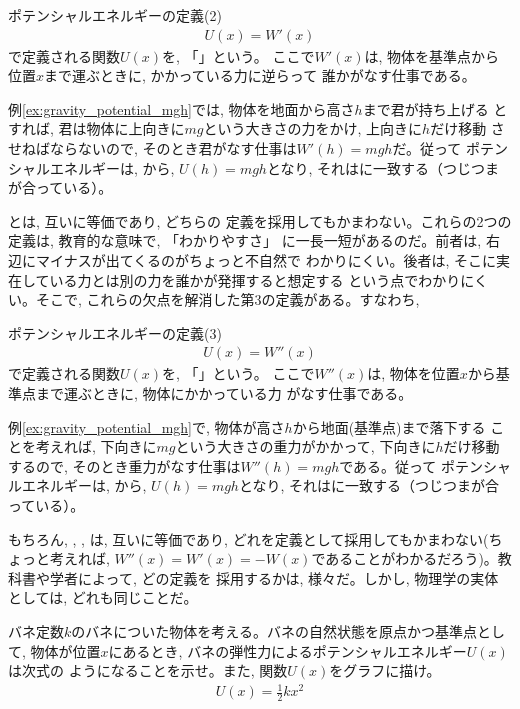 \begin{itembox}{ポテンシャルエネルギーの定義(2)}
\begin{eqnarray}
U(x)=W'(x)\label{eq:potential2}
\end{eqnarray}
で定義される関数$U(x)$を, 「」という。
ここで$W'(x)$は, 物体を基準点から位置$x$まで運ぶときに, かかっている力に逆らって
誰かがなす仕事である。
\end{itembox}

例\ref{ex:gravity_potential_mgh}では, 物体を地面から高さ$h$まで君が持ち上げる
とすれば, 君は物体に上向きに$mg$という大きさの力をかけ, 上向きに$h$だけ移動
させねばならないので, そのとき君がなす仕事は$W'(h)=mgh$だ。従って
ポテンシャルエネルギーは, から, $U(h)=mgh$となり, 
それはに一致する（つじつまが合っている）。

とは, 互いに等価であり, どちらの
定義を採用してもかまわない。これらの2つの定義は, 教育的な意味で, 「わかりやすさ」
に一長一短があるのだ。前者は, 右辺にマイナスが出てくるのがちょっと不自然で
わかりにくい。後者は, そこに実在している力とは別の力を誰かが発揮すると想定する
という点でわかりにくい。そこで, これらの欠点を解消した第3の定義がある。すなわち, 

\begin{itembox}{ポテンシャルエネルギーの定義(3)}
\begin{eqnarray}
U(x)=W''(x)\label{eq:potential3}
\end{eqnarray}
で定義される関数$U(x)$を, 「」という。
ここで$W''(x)$は, 物体を位置$x$から基準点まで運ぶときに, 物体にかかっている力
がなす仕事である。
\end{itembox}

例\ref{ex:gravity_potential_mgh}で, 物体が高さ$h$から地面(基準点)まで落下する
ことを考えれば, 下向きに$mg$という大きさの重力がかかって, 下向きに$h$だけ移動
するので, そのとき重力がなす仕事は$W''(h)=mgh$である。従って
ポテンシャルエネルギーは, から, $U(h)=mgh$となり, 
それはに一致する（つじつまが合っている）。

もちろん, , , 
は, 互いに等価であり, どれを定義として採用してもかまわない(ちょっと考えれば, 
$W''(x)=W'(x)=-W(x)$であることがわかるだろう)。教科書や学者によって, どの定義を
採用するかは, 様々だ。しかし, 物理学の実体としては, どれも同じことだ。\mv

\begin{q}\label{q:potential_spring}
バネ定数$k$のバネについた物体を考える。バネの自然状態を原点かつ基準点として, 
物体が位置$x$にあるとき, バネの弾性力によるポテンシャルエネルギー$U(x)$は次式の
ようになることを示せ。また, 関数$U(x)$をグラフに描け。
\begin{eqnarray}
U(x)=\frac{1}{2}kx^2\label{eq:potential_spring}
\end{eqnarray}
\end{q}
\mv

